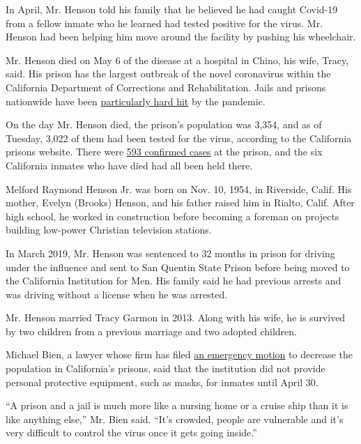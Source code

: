 In April, Mr. Henson told his family that he believed he had caught
Covid-19 from a fellow inmate who he learned had tested positive for the
virus. Mr. Henson had been helping him move around the facility by
pushing his wheelchair.

Mr. Henson died on May 6 of the disease at a hospital in Chino, his
wife, Tracy, said. His prison has the largest outbreak of the novel
coronavirus within the California Department of Corrections and
Rehabilitation. Jails and prisons nationwide have been
\href{https://www.nytimes3xbfgragh.onion/2020/03/30/us/coronavirus-prisons-jails.html}{particularly
hard hit} by the pandemic.

On the day Mr. Henson died, the prison's population was 3,354, and as of
Tuesday, 3,022 of them had been tested for the virus, according to the
California prisons website. There were
\href{https://www.cdcr.ca.gov/covid19/population-status-tracking/}{593
confirmed cases} at the prison, and the six California inmates who have
died had all been held there.

Melford Raymond Henson Jr. was born on Nov. 10, 1954, in Riverside,
Calif. His mother, Evelyn (Brooks) Henson, and his father raised him in
Rialto, Calif. After high school, he worked in construction before
becoming a foreman on projects building low-power Christian television
stations.

In March 2019, Mr. Henson was sentenced to 32 months in prison for
driving under the influence and sent to San Quentin State Prison before
being moved to the California Institution for Men. His family said he
had previous arrests and was driving without a license when he was
arrested.

Mr. Henson married Tracy Garmon in 2013. Along with his wife, he is
survived by two children from a previous marriage and two adopted
children.

Michael Bien, a lawyer whose firm has filed
\href{https://rbgg.com/wp-content/uploads/Emergency-Motion-Coleman-and-Plata-Three-Judge-Court-Dkt-No-6522-filed-2020-03-25.pdf}{an
emergency motion} to decrease the population in California's prisons,
said that the institution did not provide personal protective equipment,
such as masks, for inmates until April 30.

``A prison and a jail is much more like a nursing home or a cruise ship
than it is like anything else,'' Mr. Bien said. ``It's crowded, people
are vulnerable and it's very difficult to control the virus once it gets
going inside.''

